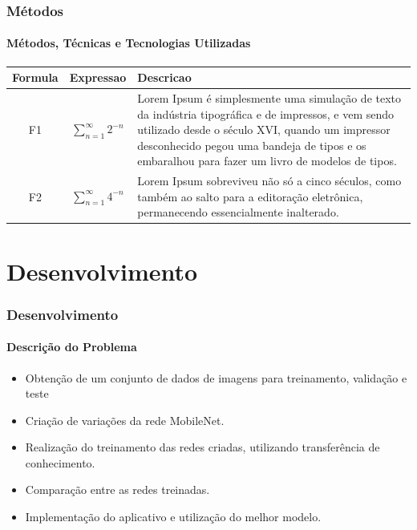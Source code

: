 \documentclass{beamer}
\begin{document}
    
    \begin{frame}
      \frametitle{Métodos}
      \framesubtitle{Métodos, Técnicas e Tecnologias Utilizadas}      
        \begin{center}
            \begin{tabular}{ |c|c|p{7cm}| } 
            \hline
            Formula & Expressao & Descricao \\
            \hline
            \multirow{5}{*}{F1} & \multirow{5}{*}{$\sum_{n=1}^{\infty} 2^{-n}$} & \multirow{5}{7cm}{\footnotesize{Lorem Ipsum é simplesmente uma simulação de texto da indústria tipográfica e de impressos, e vem sendo utilizado desde o século XVI, quando um impressor desconhecido pegou uma bandeja de tipos e os embaralhou para fazer um livro de modelos de tipos.}~\cite{loremipsum}} \\ %
            & & \\ %
            & & \\ %
            & & \\ %
            & & \\ %
            \hline
            \multirow{3}{*}{F2} & \multirow{3}{*}{$\sum_{n=1}^{\infty} 4^{-n}$} & \multirow{3}{7cm}{\footnotesize{Lorem Ipsum sobreviveu não só a cinco séculos, como também ao salto para a editoração eletrônica, permanecendo essencialmente inalterado.}~\cite{loremipsum}} \\ %
            & & \\ %
            & & \\ %
            \hline
            \end{tabular}
        \end{center}
      
    \end{frame}
    
    \section{Desenvolvimento}    
    \begin{frame}
      \frametitle{Desenvolvimento}
      \framesubtitle{Descrição do Problema}
      \begin{itemize}    
			\item Obtenção de um conjunto de dados de imagens para treinamento, validação e teste            
            \item Criação de variações da rede MobileNet.
            \item Realização do treinamento das redes criadas, utilizando transferência de conhecimento.
            \item Comparação entre as redes treinadas.
            \item Implementação do aplicativo e utilização do melhor modelo.
            \end{itemize}
    \end{frame}
    
\end{document}
